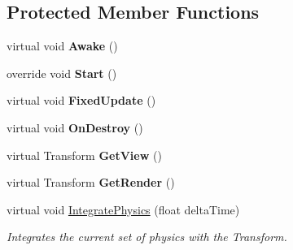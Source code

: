 \subsection*{Protected Member Functions}
\begin{DoxyCompactItemize}
\item 
\hypertarget{class_skyrates_1_1_common_1_1_entity_1_1_entity_dynamic_a2364ce439984919790139305d2d2f91b}{virtual void {\bfseries Awake} ()}\label{class_skyrates_1_1_common_1_1_entity_1_1_entity_dynamic_a2364ce439984919790139305d2d2f91b}

\item 
\hypertarget{class_skyrates_1_1_common_1_1_entity_1_1_entity_dynamic_a0e3f4c361734de124f27ed7d331bd12c}{override void {\bfseries Start} ()}\label{class_skyrates_1_1_common_1_1_entity_1_1_entity_dynamic_a0e3f4c361734de124f27ed7d331bd12c}

\item 
\hypertarget{class_skyrates_1_1_common_1_1_entity_1_1_entity_dynamic_adc9f4729654d4c86a404c0ccd966ccd3}{virtual void {\bfseries Fixed\-Update} ()}\label{class_skyrates_1_1_common_1_1_entity_1_1_entity_dynamic_adc9f4729654d4c86a404c0ccd966ccd3}

\item 
\hypertarget{class_skyrates_1_1_common_1_1_entity_1_1_entity_dynamic_a29fdd6f0b967349e6b9efb695f74a647}{virtual void {\bfseries On\-Destroy} ()}\label{class_skyrates_1_1_common_1_1_entity_1_1_entity_dynamic_a29fdd6f0b967349e6b9efb695f74a647}

\item 
\hypertarget{class_skyrates_1_1_common_1_1_entity_1_1_entity_dynamic_a7d214d221e4933f54528a707da1cc129}{virtual Transform {\bfseries Get\-View} ()}\label{class_skyrates_1_1_common_1_1_entity_1_1_entity_dynamic_a7d214d221e4933f54528a707da1cc129}

\item 
\hypertarget{class_skyrates_1_1_common_1_1_entity_1_1_entity_dynamic_ad59c47f109bef0238b5303646a59e430}{virtual Transform {\bfseries Get\-Render} ()}\label{class_skyrates_1_1_common_1_1_entity_1_1_entity_dynamic_ad59c47f109bef0238b5303646a59e430}

\item 
virtual void \hyperlink{class_skyrates_1_1_common_1_1_entity_1_1_entity_dynamic_a994dbf8d2f10ff4398dbf2f68049205a}{Integrate\-Physics} (float delta\-Time)
\begin{DoxyCompactList}\small\item\em Integrates the current set of physics with the Transform. \end{DoxyCompactList}\end{DoxyCompactItemize}
